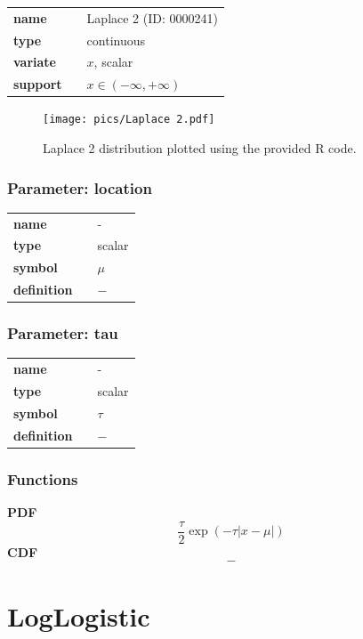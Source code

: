\documentclass{article}
\begin{document}
  \bigskip 

\begin{tabular}{p{2cm}cl}
\textbf{name} & & Laplace 2 (ID: 0000241)\\ 
 
\textbf{type} & & continuous \\ 

\textbf{variate} & & $x$, scalar \\ 

\textbf{support} & & $x \in (-\infty,+\infty)$
\end{tabular}

\begin{figure}[ht!]
\centering
  \texttt{[image: pics/Laplace 2.pdf]}
 \caption{Laplace 2 distribution plotted using the provided R code.}
 \label{fig:Laplace 2}
\end{figure}

\subsubsection*{Parameter: location}

\noindent\begin{tabular}{p{2cm}cl}
\textbf{name} & & - \\
\textbf{type} & & scalar \\
\textbf{symbol} & & $\mu$  \\
\textbf{definition} & & $-$
\end{tabular}
\subsubsection*{Parameter: tau}

\noindent\begin{tabular}{p{2cm}cl}
\textbf{name} & & - \\
\textbf{type} & & scalar \\
\textbf{symbol} & & $\tau$  \\
\textbf{definition} & & $-$
\end{tabular}
\subsubsection*{Functions}

\smallskip \noindent \hspace{.2cm} \textbf{PDF} 
\begin{equation*}\frac{\tau}{2} \exp \left(-\tau|x-\mu| \right)\end{equation*}
\smallskip \noindent \hspace{.2cm} \textbf{CDF} 
\begin{equation*}-\end{equation*}
\smallskip\section*{LogLogistic} 
\end{document}
